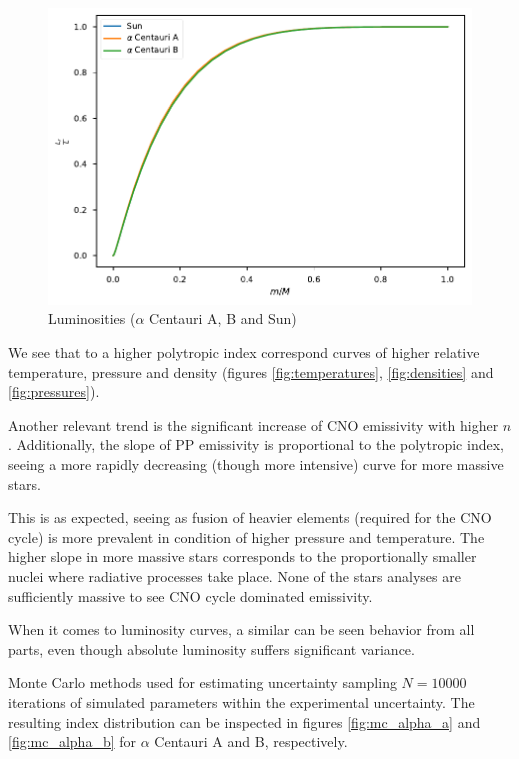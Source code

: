 \documentclass{aa}
\begin{document}
\begin{figure}
  \centering
  \includegraphics[width=\linewidth]{../figures/luminosities.pdf}
  \caption{Luminosities ($\alpha$ Centauri A, B and Sun)}
  \label{fig:luminosities}
\end{figure}

We see that to a higher polytropic index correspond curves of higher
relative temperature, pressure and density (figures \ref{fig:temperatures},
\ref{fig:densities} and \ref{fig:pressures}).

Another relevant trend is the significant increase of CNO emissivity with higher
$n$. Additionally, the slope of PP emissivity is proportional to the polytropic
index, seeing a more rapidly decreasing (though more intensive) curve for more
massive stars.

This is as expected, seeing as fusion of heavier elements (required for the CNO
cycle)  is more prevalent in condition of higher pressure and temperature. The higher slope
in more massive stars corresponds to the proportionally smaller nuclei where
radiative processes take place.
None of the stars analyses are sufficiently massive to see CNO cycle dominated emissivity.

When it comes to luminosity curves, a similar can be seen behavior from all parts, even
though absolute luminosity suffers significant variance.

Monte Carlo methods used for estimating uncertainty sampling $N = 10000$
iterations of simulated parameters within the experimental uncertainty. The
resulting index distribution can be inspected in figures \ref{fig:mc_alpha_a}
and \ref{fig:mc_alpha_b} for $\alpha$ Centauri A and B, respectively.
\end{document}

